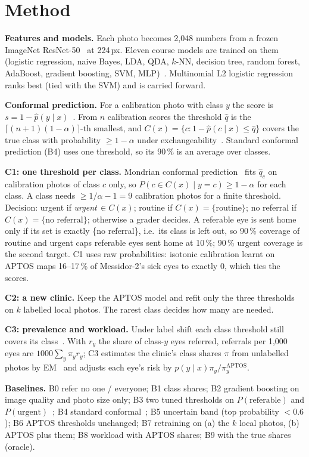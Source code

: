 \documentclass[10pt,twocolumn,letterpaper]{article}
\newcommand{\pct}{\,\%}
\begin{document}
\section{Method}
\textbf{Features and models.} Each photo becomes 2,048 numbers from a frozen ImageNet ResNet-50~\cite{he,timm} at 224\,px. Eleven course models are trained on them (logistic regression, naive Bayes, LDA, QDA, $k$-NN, decision tree, random forest, AdaBoost, gradient boosting, SVM, MLP)~\cite{sklearn}. Multinomial L2 logistic regression ranks best (tied with the SVM) and is carried forward.

\textbf{Conformal prediction.} For a calibration photo with class $y$ the score is $s=1-\hat p(y\mid x)$~\cite{sadinle}. From $n$ calibration scores the threshold $\hat q$ is the $\lceil (n+1)(1-\alpha)\rceil$-th smallest, and $C(x)=\{c: 1-\hat p(c\mid x)\le \hat q\}$ covers the true class with probability $\ge 1-\alpha$ under exchangeability~\cite{vovk,ahamed}. Standard conformal prediction (B4) uses one threshold, so its 90\pct{} is an average over classes.

\textbf{C1: one threshold per class.} Mondrian conformal prediction~\cite{vovk} fits $\hat q_c$ on calibration photos of class $c$ only, so $P(c\in C(x)\mid y=c)\ge 1-\alpha$ for each class. A class needs $\ge 1/\alpha-1=9$ calibration photos for a finite threshold. Decision: urgent if \emph{urgent}$\,\in C(x)$; routine if $C(x)=\{\text{routine}\}$; no referral if $C(x)=\{\text{no referral}\}$; otherwise a grader decides. A referable eye is sent home only if its set is exactly \{no referral\}, i.e.\ its class is left out, so 90\pct{} coverage of routine and urgent caps referable eyes sent home at 10\pct; 90\pct{} urgent coverage is the second target. C1 uses raw probabilities: isotonic calibration learnt on APTOS maps 16--17\pct{} of Messidor-2's sick eyes to exactly 0, which ties the scores.

\textbf{C2: a new clinic.} Keep the APTOS model and refit only the three thresholds on $k$ labelled local photos. The rarest class decides how many are needed.

\textbf{C3: prevalence and workload.} Under label shift each class threshold still covers its class~\cite{podkopaev}. With $r_y$ the share of class-$y$ eyes referred, referrals per 1,000 eyes are $1000\sum_y \pi_y r_y$; C3 estimates the clinic's class shares $\pi$ from unlabelled photos by EM~\cite{saerens} and adjusts each eye's risk by $p(y\mid x)\pi_y/\pi^{\text{APTOS}}_y$.

\textbf{Baselines.} B0 refer no one / everyone; B1 class shares; B2 gradient boosting on image quality and photo size only; B3 two tuned thresholds on $P(\text{referable})$ and $P(\text{urgent})$~\cite{gulshan16,abramoff16}; B4 standard conformal~\cite{hasan}; B5 uncertain band (top probability $<0.6$); B6 APTOS thresholds unchanged; B7 retraining on (a) the $k$ local photos, (b) APTOS plus them; B8 workload with APTOS shares; B9 with the true shares (oracle).
\end{document}
